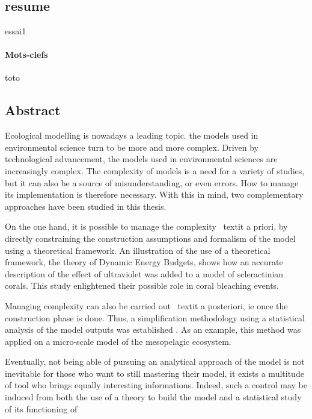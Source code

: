     \thispagestyle{empty}
\chapter*{}
\section*{resume}
essai1


\subsubsection*{Mots-clefs}
toto



  \vspace{0.5cm}



 \newpage

  \section*{Abstract}

Ecological modelling is nowadays a leading topic. the models used in environmental science turn to be more and more complex. Driven by technological advancement, the models used in environmental sciences are increasingly complex. The complexity of models is a need for a variety of studies, but it can also be a source of misunderstanding, or even errors. How to manage its implementation is  therefore necessary. With this in mind, two complementary approaches have been studied in this thesis.

On the one hand, it is possible to manage the complexity \ textit {a priori},  by directly constraining the construction assumptions and formalism of the model using a theoretical framework. An illustration of the use of a theoretical framework, the theory of Dynamic Energy Budgets, shows how an accurate description of the effect of ultraviolet was added to a model of scleractinian corals. This study enlightened their possible role in coral bleaching events.

  Managing complexity can also be carried out \ textit {a posteriori}, ie once the construction phase is done. Thus, a simplification methodology using a statistical analysis of the model outputs was established . As an example, this method was applied on a micro-scale model of the mesopelagic ecosystem.

Eventually, not being able of pursuing an analytical approach of the model is not inevitable for those who want to still mastering their model, it exists a multitude of tool who brings equally interesting informations. Indeed, such a control may be induced from both the use of a theory to build the model and a statistical study of its functioning of

